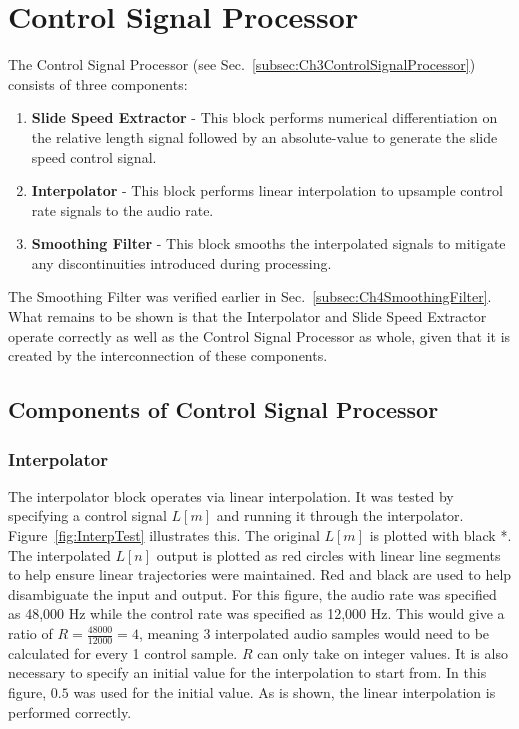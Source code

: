 \documentclass[../main.tex]{subfiles}
\begin{document}
\section{Control Signal Processor}
The Control Signal Processor (see Sec.~\ref{subsec:Ch3ControlSignalProcessor}) consists of three components:
\begin{enumerate}
    \item \textbf{Slide Speed Extractor} - This block performs numerical differentiation on the relative length signal followed by an absolute-value to generate the slide speed control signal.
    \item \textbf{Interpolator} - This block performs linear interpolation to upsample control rate signals to the audio rate.
    \item \textbf{Smoothing Filter} - This block smooths the interpolated signals to mitigate any discontinuities introduced during processing.
\end{enumerate}
The Smoothing Filter was verified earlier in Sec.~\ref{subsec:Ch4SmoothingFilter}. What remains to be shown is that the Interpolator and Slide Speed Extractor operate correctly as well as the Control Signal Processor as whole, given that it is created by the interconnection of these components.

\subsection{Components of Control Signal Processor}
\subsubsection{Interpolator}
The interpolator block operates via linear interpolation.  It was tested by specifying a control signal $L[m]$ and running it through the interpolator. Figure~\ref{fig:InterpTest} illustrates this. The original $L[m]$ is plotted with black *. The interpolated $L[n]$ output is plotted as red circles with linear line segments to help ensure linear trajectories were maintained. Red and black are used to help disambiguate the input and output. For this figure, the audio rate was specified as 48,000 Hz while the control rate was specified as 12,000 Hz. This would give a ratio of $R = \frac{48000}{12000} = 4$, meaning 3 interpolated audio samples would need to be calculated for every 1 control sample. $R$ can only take on integer values. It is also necessary to specify an initial value for the interpolation to start from. In this figure, $0.5$ was used for the initial value. As is shown, the linear interpolation is performed correctly.
\end{document}
